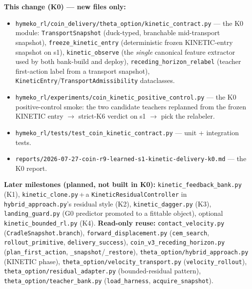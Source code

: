 \documentclass[11pt]{article}
\newcommand{\code}[1]{\texttt{\small #1}}
\begin{document}
\smallskip\noindent\textbf{This change (K0) --- new files only:}
\begin{itemize}[nosep,leftmargin=1.4em]
  \item \code{hymeko\_rl/coin\_delivery/theta\_option/kinetic\_contract.py} --- the K0 module:
  \code{TransportSnapshot} (duck-typed, branchable mid-transport snapshot), \code{freeze\_kinetic\_entry}
  (deterministic frozen KINETIC-entry snapshot on s1), \code{kinetic\_observe} (the \emph{single} canonical feature
  extractor used by both bank-build and deploy), \code{receding\_horizon\_relabel} (teacher first-action label from a
  transport snapshot), \code{KineticEntry}/\code{TransportAdmissibility} dataclasses.
  \item \code{hymeko\_rl/experiments/coin\_kinetic\_positive\_control.py} --- the K0 positive-control smoke: the two
  candidate teachers replanned from the frozen KINETIC entry $\to$ strict-K6 verdict on s1 $\to$ pick the relabeler.
  \item \code{hymeko\_rl/tests/test\_coin\_kinetic\_contract.py} --- unit + integration tests.
  \item \code{reports/2026-07-27-coin-r9-learned-s1-kinetic-delivery-k0.md} --- the K0 report.
\end{itemize}
\textbf{Later milestones (planned, not built in K0):} \code{kinetic\_feedback\_bank.py} (K1),
\code{kinetic\_clone.py}\,+\,a \code{KineticResidualController} in \code{hybrid\_approach.py}'s residual style (K2),
\code{kinetic\_dagger.py} (K3), \code{landing\_guard.py} (G0 predictor promoted to a fittable object),
optional \code{kinetic\_bounded\_rl.py} (K4). \textbf{Read-only reuse:} \code{contact\_velocity.py}
(\code{CradleSnapshot.branch}), \code{forward\_displacement.py} (\code{cem\_search}, \code{rollout\_primitive},
\code{delivery\_success}), \code{coin\_v3\_receding\_horizon.py} (\code{plan\_first\_action}, \code{\_snapshot}/\code{\_restore}),
\code{theta\_option/hybrid\_approach.py} (KINETIC phase), \code{theta\_option/velocity\_transport.py}
(\code{velocity\_rollout}), \code{theta\_option/residual\_adapter.py} (bounded-residual pattern),
\code{theta\_option/teacher\_bank.py} (\code{load\_harness}, \code{acquire\_snapshot}).
\end{document}
